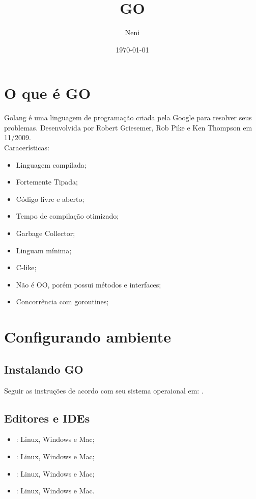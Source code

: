 \documentclass{apostila}
\title{GO}
\author{Neni}
\date{\today}
\begin{document}
\chapter{O que é GO}
\begin{flushleft}

    Golang é uma linguagem de programação criada pela Google para resolver seus problemas\cite[1]{cod3r}. Desenvolvida por Robert Griesemer, Rob Pike e Ken Thompson em 11/2009\cite[4]{cod3r}.
    \\
    Caracerísticas:
    \begin{itemize}
        \item Linguagem compilada\cite[1]{cod3r};
        \item Fortemente Tipada\cite[4]{cod3r};
        \item Código livre e aberto\cite[4]{cod3r};
        \item Tempo de compilação otimizado\cite[4]{cod3r};
        \item Garbage Collector\cite[4]{cod3r};
        \item Linguam mínima\cite[4]{cod3r};
        \item C-like\cite[4]{cod3r};
        \item Não é OO, porém possui métodos e interfaces\cite[4]{cod3r};
        \item Concorrência com goroutines\cite[4]{cod3r};
    \end{itemize}
\end{flushleft}

\chapter{Configurando ambiente}
\section{Instalando GO}
Seguir as instruções de acordo com seu sistema operaional em: .


\section{Editores e IDEs}
\begin{itemize}
    \item {}: Linux, Windows e Mac;
    \item {}: Linux, Windows e Mac\footnotemark[1];
    \item {}: Linux, Windows e Mac\footnotemark[1];
    \item {}: Linux, Windows e Mac.
\end{itemize}
\end{document}
